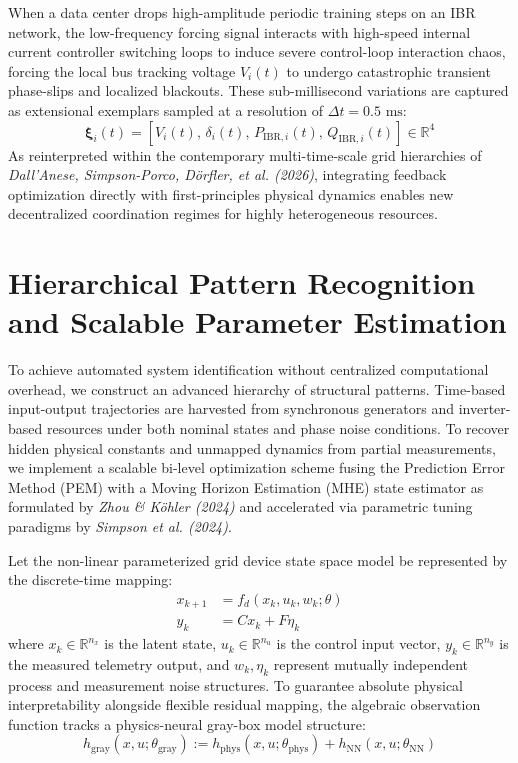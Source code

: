 \documentclass[11pt,fleqn]{article}
\begin{document}
When a data center drops high-amplitude periodic training steps on an IBR network, the low-frequency forcing signal interacts with high-speed internal current controller switching loops to induce severe control-loop interaction chaos, forcing the local bus tracking voltage $V_i(t)$ to undergo catastrophic transient phase-slips and localized blackouts. These sub-millisecond variations are captured as extensional exemplars sampled at a resolution of $\Delta t = 0.5\text{ ms}$:
\begin{equation}
\bm{\xi}_i(t) = \left[ V_i(t), \, \delta_i(t), \, P_{\text{IBR}, i}(t), \, Q_{\text{IBR}, i}(t) \right] \in \mathbb{R}^4
\end{equation}
As reinterpreted within the contemporary multi-time-scale grid hierarchies of \textit{Dall'Anese, Simpson-Porco, Dörfler, et al. (2026)}, integrating feedback optimization directly with first-principles physical dynamics enables new decentralized coordination regimes for highly heterogeneous resources.

\section{Hierarchical Pattern Recognition and Scalable Parameter Estimation}
To achieve automated system identification without centralized computational overhead, we construct an advanced hierarchy of structural patterns. Time-based input-output trajectories are harvested from synchronous generators and inverter-based resources under both nominal states and phase noise conditions. To recover hidden physical constants and unmapped dynamics from partial measurements, we implement a scalable bi-level optimization scheme fusing the Prediction Error Method (PEM) with a Moving Horizon Estimation (MHE) state estimator as formulated by \textit{Zhou \& Köhler (2024)} and accelerated via parametric tuning paradigms by \textit{Simpson et al. (2024)}.

Let the non-linear parameterized grid device state space model be represented by the discrete-time mapping:
\begin{align}
x_{k+1} &= f_d(x_k, u_k, w_k; \theta) \\
y_k &= C x_k + F \eta_k
\end{align}
where $x_k \in \mathbb{R}^{n_x}$ is the latent state, $u_k \in \mathbb{R}^{n_u}$ is the control input vector, $y_k \in \mathbb{R}^{n_y}$ is the measured telemetry output, and $w_k, \eta_k$ represent mutually independent process and measurement noise structures. To guarantee absolute physical interpretability alongside flexible residual mapping, the algebraic observation function tracks a physics-neural gray-box model structure:
\begin{equation}
h_{\text{gray}}(x, u; \theta_{\text{gray}}) := h_{\text{phys}}(x, u; \theta_{\text{phys}}) + h_{\text{NN}}(x, u; \theta_{\text{NN}})
\end{equation}
\end{document}
